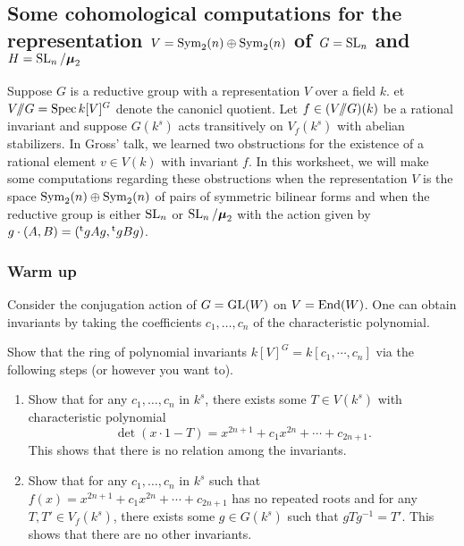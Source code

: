 \subsection{Some cohomological computations for the representation \texorpdfstring{$V=\operatorname{Sym}_2(n)\oplus \operatorname{Sym}_2(n)$}{V=Sym2(n)+Sym2(n)} of \texorpdfstring{$G=\operatorname{SL}_n$}{G=SLn} and \texorpdfstring{$H=\operatorname{SL}_n/\boldsymbol\mu_2$}{H=SL2/mu2}}

Suppose $G$ is a reductive group with a representation $V$ over a field $k$. 
et $V/\!\!/ G=\operatorname{Spec} k[V]^G$ denote the canonicl quotient. Let 
$f\in (V/\!\!/ G)(k)$ be a rational invariant and suppose $G(k^s)$ acts 
transitively on $V_f(k^s)$ with abelian stabilizers. In Gross' talk, we 
learned two obstructions for the existence of a rational element $v\in V(k)$ 
with invariant $f$. In this worksheet, we will make some computations regarding 
these obstructions when the representation $V$ is the space 
$\operatorname{Sym}_2(n)\oplus\operatorname{Sym}_2(n)$ of pairs of symmetric bilinear forms and 
when the reductive group is either $\operatorname{SL}_n$ or 
$\operatorname{SL}_n/\boldsymbol\mu_2$ with the action given by 
$g\cdot (A,B)=(\prescript{\mathrm{t}}{}{g} A g, \prescript{\mathrm{t}}{}{g} B g)$. 


\subsubsection{Warm up}

Consider the conjugation action of $G=\operatorname{GL}(W)$ on $V=\operatorname{End}(W)$. One 
can obtain invariants by taking the coefficients $c_1,\dots,c_n$ of the 
characteristic polynomial. 

\begin{exercise}
Show that the ring of polynomial invariants $k[V]^G=k[c_1,\cdots,c_n]$ via the 
following steps (or however you want to). 
\begin{enumerate}
  \item Show that for any $c_1,\dots,c_n$ in $k^s$, there exists some 
    $T\in V(k^s)$ with characteristic polynomial 
    \[
      \det(x\cdot 1-T) = x^{2n+1} + c_1 x^{2n} + \cdots + c_{2n+1} .
    \]
    This shows that there is no relation among the invariants. 
  \item Show that for any $c_1,\dots,c_n$ in $k^s$ such that 
    $f(x)=x^{2n+1} + c_1 x^{2n} + \cdots + c_{2n+1}$ has no repeated roots and 
    for any $T,T'\in V_f(k^s)$, there exists some $g\in G(k^s)$ such that 
    $g T g^{-1} = T'$. This shows that there are no other invariants. 
\end{enumerate}
\end{exercise}

